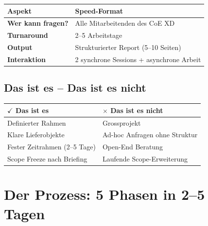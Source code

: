 \documentclass[11pt,a4paper]{article}
\newcommand{\fahead}[1]{\textcolor{fawhite}{\bfseries #1}}
\begin{document}
\vspace{0.5cm}

\begin{center}
\begin{tabular}{p{4cm}p{9cm}}
\toprule
\rowcolor{fadarkblue}
\fahead{Aspekt} & \fahead{Speed-Format} \\
\midrule
\rowcolor{fawhite}
\textbf{Wer kann fragen?} & Alle Mitarbeitenden des CoE XD \\
\rowcolor{falightgray}
\textbf{Turnaround} & 2--5 Arbeitstage \\
\rowcolor{fawhite}
\textbf{Output} & Strukturierter Report (5--10 Seiten) \\
\rowcolor{falightgray}
\textbf{Interaktion} & 2 synchrone Sessions + asynchrone Arbeit \\
\bottomrule
\end{tabular}
\end{center}

\vspace{0.8cm}

\subsection{Das ist es -- Das ist es nicht}

\begin{center}
\begin{tabular}{p{6.5cm}p{6.5cm}}
\rowcolor{famint!20}
\textbf{\color{famint}$\checkmark$ Das ist es} & \textbf{\color{faorange}$\times$ Das ist es nicht} \\
\midrule
Definierter Rahmen & Grossprojekt \\
Klare Lieferobjekte & Ad-hoc Anfragen ohne Struktur \\
Fester Zeitrahmen (2--5 Tage) & Open-End Beratung \\
Scope Freeze nach Briefing & Laufende Scope-Erweiterung \\
\end{tabular}
\end{center}

\newpage
\section{Der Prozess: 5 Phasen in 2--5 Tagen}
\end{document}
